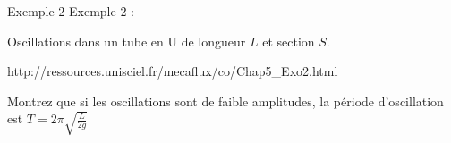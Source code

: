 \begin{frame}{Exemple 2 }
Exemple 2  :

\medskip

Oscillations dans un tube en U de longueur $L$ et section $S$.


\bigskip


http://ressources.unisciel.fr/mecaflux/co/Chap5\_Exo2.html


\bigskip

{\color{vert}{Exercice : }}

Montrez que si les oscillations sont de faible amplitudes, la période d'oscillation est
$T = 2\pi \sqrt{\frac{L}{2g}}$


\vspace{0mm}



\end{frame}

  

